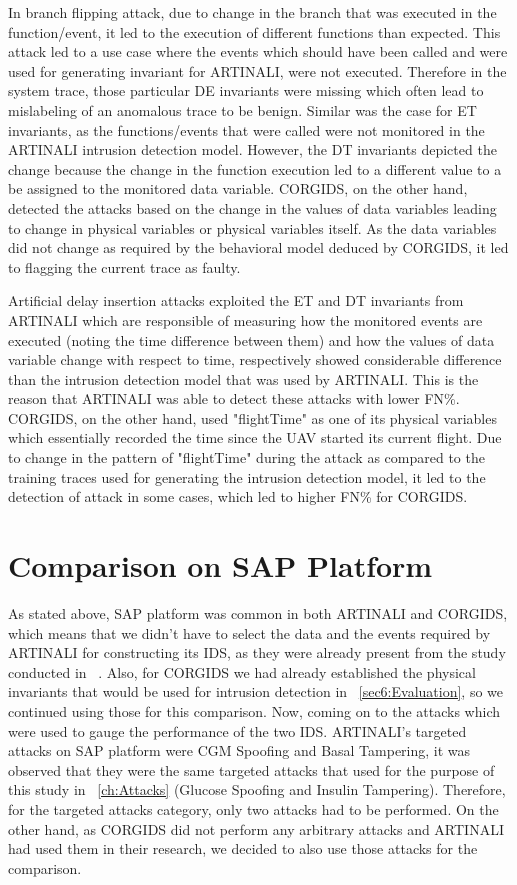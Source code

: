 In branch flipping attack, due to change in the branch that was executed in the function/event, it led to the execution of different functions than expected. This attack led to a use case where the events which should have been called and were used for generating invariant for ARTINALI, were not executed. Therefore in the system trace, those particular D\textbar E invariants were missing which often lead to mislabeling of an anomalous trace to be benign. Similar was the case for E\textbar T invariants, as the functions/events that were called were not monitored in the ARTINALI intrusion detection model. However, the D\textbar T invariants depicted the change because the change in the function execution led to a different value to a be assigned to the monitored data variable. CORGIDS, on the other hand, detected the attacks based on the change in the values of data variables leading to change in physical variables or physical variables itself. As the data variables did not change as required by the behavioral model deduced by CORGIDS, it led to flagging the current trace as faulty.

Artificial delay insertion attacks exploited the E\textbar T and D\textbar T invariants from ARTINALI which are responsible of measuring how the monitored events are executed (noting the time difference between them) and how the values of data variable change with respect to time, respectively showed considerable difference than the intrusion detection model that was used by ARTINALI. This is the reason that ARTINALI was able to detect these attacks with lower FN\%. CORGIDS, on the other hand, used "flightTime" as one of its physical variables which essentially recorded the time since the UAV started its current flight. Due to change in the pattern of "flightTime" during the attack as compared to the training traces used for generating the intrusion detection model, it led to the detection of attack in some cases, which led to higher FN\% for CORGIDS.


\section{Comparison on SAP Platform}
As stated above, SAP platform was common in both ARTINALI and CORGIDS, which means that we didn't have to select the data and the events required by ARTINALI for constructing its IDS, as they were already present from the study conducted in ~\cite{aliabadi2017artinali}. Also, for CORGIDS we had already established the physical invariants that would be used for intrusion detection in ~\autoref{sec6:Evaluation}, so we continued using those for this comparison. Now, coming on to the attacks which were used to gauge the performance of the two IDS. ARTINALI's targeted attacks on SAP platform were CGM Spoofing and Basal Tampering, it was observed that they were the same targeted attacks that used for the purpose of this study in ~\autoref{ch:Attacks} (Glucose Spoofing and Insulin Tampering). Therefore, for the targeted attacks category, only two attacks had to be performed. On the other hand, as CORGIDS did not perform any arbitrary attacks and ARTINALI had used them in their research, we decided to also use those attacks for the comparison.

